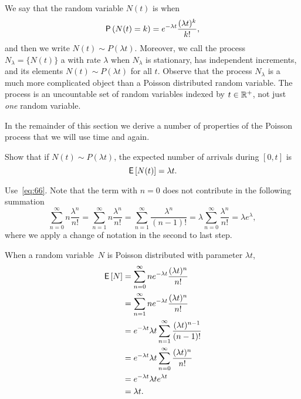 We say that the random variable $N(t)$ is  when 
\begin{equation}\label{eq:pois}
  \P{N(t) = k} = 
e^{-\lambda t} \frac{(\lambda t)^k}{k!}, 
\end{equation}
and then we write $N(t)\sim P(\lambda t)$.
Moreover, we call the process $N_\lambda=\{N(t)\}$ a  with rate $\lambda$ when $N_\lambda$ is stationary, has independent increments, and its elements $N(t)\sim P(\lambda t)$ for all $t$.
Observe that the process $N_\lambda$ is a much more complicated object than a Poisson distributed random variable.
The process is an uncountable set of random variables indexed by $t\in \mathbb{R}^+$, not just \emph{one} random variable.


In the remainder of this section we derive a number of  properties of the Poisson process that we will use time and again.

\begin{exercise}{\faCalculator}\label{ex:2}
  Show that if $N(t)\sim P(\lambda t)$, the expected number of arrivals during $[0,t]$ is
  \begin{equation*}
  \,\mathsf{E}\left[N(t)\right] = \lambda t.
  \end{equation*}
  \begin{hint}
Use~\eqref{eq:66}. Note  that the term with $n=0$ does not contribute in the following summation
\begin{equation*}
\sum_{n=0}^\infty n \frac{\lambda^n}{n!} = \sum_{n=1}^\infty n \frac{\lambda^n}{n!} = \sum_{n=1}^\infty \frac{\lambda^n}{(n-1)!} = \lambda \sum_{n=0}^\infty \frac{\lambda^n}{n!} = \lambda e^{\lambda},
\end{equation*}
where we apply a change of notation in the second to last step.
  \end{hint}
  \begin{solution} 
    When a random variable~$N$ is Poisson distributed with parameter
    $\lambda t$,
    \begin{align*}
      \,\mathsf{E}\left[N\right] 
&= \sum_{n=0}^\infty n e^{-\lambda t}\frac{(\lambda t)^n}{n!}  \\
&= \sum_{n=1}^\infty n e^{-\lambda t}\frac{(\lambda t)^n}{n!} \\ 
&= e^{-\lambda t} \lambda t \sum_{n=1}^\infty \frac{(\lambda t)^{n-1}}{(n-1)!} \\
&= e^{-\lambda t} \lambda t \sum_{n=0}^\infty \frac{(\lambda t)^{n}}{n!} \\
&= e^{-\lambda t} \lambda t e^{\lambda t} \\
&= \lambda t.
    \end{align*}
\end{solution}
\end{exercise}


